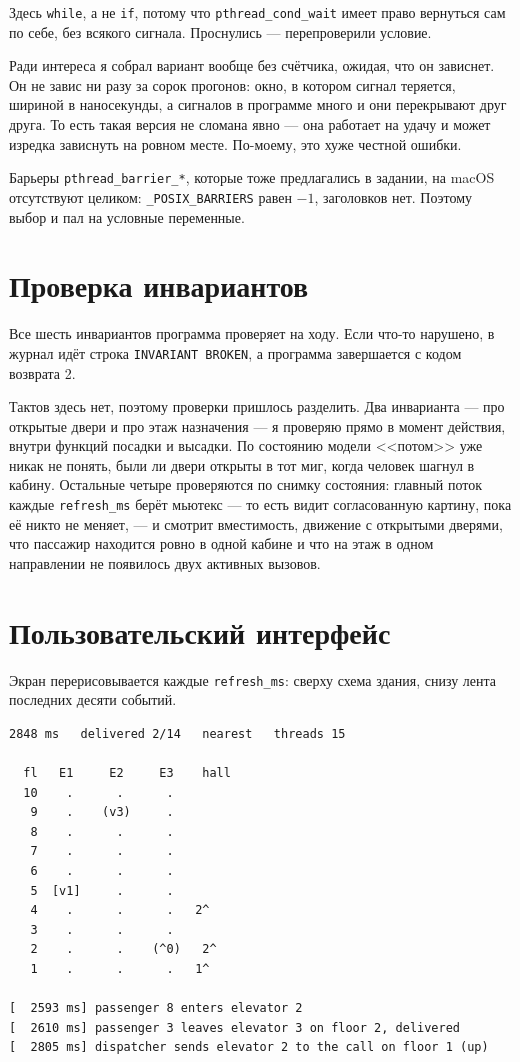 \documentclass[12pt,a4paper]{article}
\begin{document}
Здесь \verb|while|, а не \verb|if|, потому что \verb|pthread_cond_wait|
имеет право вернуться сам по себе, без всякого сигнала. Проснулись ---
перепроверили условие.

Ради интереса я собрал вариант вообще без счётчика, ожидая, что он
зависнет. Он не завис ни разу за сорок прогонов: окно, в котором сигнал
теряется, шириной в наносекунды, а сигналов в программе много и они
перекрывают друг друга. То есть такая версия не сломана явно --- она
работает на удачу и может изредка зависнуть на ровном месте. По-моему,
это хуже честной ошибки.

Барьеры \verb|pthread_barrier_*|, которые тоже предлагались в задании, на
macOS отсутствуют целиком: \verb|_POSIX_BARRIERS| равен $-1$, заголовков
нет. Поэтому выбор и пал на условные переменные.

\section{Проверка инвариантов}

Все шесть инвариантов программа проверяет на ходу. Если что-то нарушено,
в журнал идёт строка \verb|INVARIANT BROKEN|, а программа завершается с
кодом возврата 2.

Тактов здесь нет, поэтому проверки пришлось разделить. Два инварианта ---
про открытые двери и про этаж назначения --- я проверяю прямо в момент
действия, внутри функций посадки и высадки. По состоянию модели
<<потом>> уже никак не понять, были ли двери открыты в тот миг, когда
человек шагнул в кабину. Остальные четыре проверяются по снимку
состояния: главный поток каждые \verb|refresh_ms| берёт мьютекс --- то
есть видит согласованную картину, пока её никто не меняет, --- и смотрит
вместимость, движение с открытыми дверями, что пассажир находится ровно в
одной кабине и что на этаж в одном направлении не появилось двух
активных вызовов.

\section{Пользовательский интерфейс}

Экран перерисовывается каждые \verb|refresh_ms|: сверху схема здания,
снизу лента последних десяти событий.

{\small
\begin{verbatim}
2848 ms   delivered 2/14   nearest   threads 15

  fl   E1     E2     E3    hall
  10    .      .      .
   9    .    (v3)     .
   8    .      .      .
   7    .      .      .
   6    .      .      .
   5  [v1]     .      .
   4    .      .      .   2^
   3    .      .      .
   2    .      .    (^0)   2^
   1    .      .      .   1^

[  2593 ms] passenger 8 enters elevator 2
[  2610 ms] passenger 3 leaves elevator 3 on floor 2, delivered
[  2805 ms] dispatcher sends elevator 2 to the call on floor 1 (up)
\end{verbatim}
}
\end{document}
